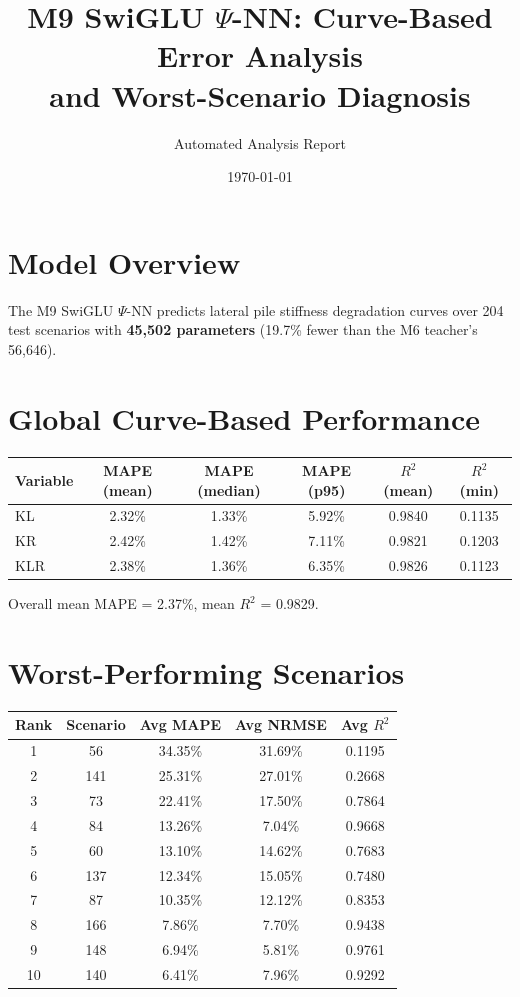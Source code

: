 \documentclass[11pt,a4paper]{article}
\title{M9 SwiGLU $\Psi$-NN: Curve-Based Error Analysis\\and Worst-Scenario Diagnosis}
\author{Automated Analysis Report}
\date{\today}
\begin{document}
\maketitle

\section{Model Overview}
The M9 SwiGLU $\Psi$-NN predicts lateral pile stiffness degradation curves over 204 test scenarios with
\textbf{45,502 parameters} (19.7\% fewer than the M6 teacher's 56,646).

\section{Global Curve-Based Performance}
\begin{table}[h]
\centering
\begin{tabular}{lccccc}
\toprule
\textbf{Variable} & \textbf{MAPE (mean)} & \textbf{MAPE (median)} & \textbf{MAPE (p95)} & \textbf{$R^2$ (mean)} & \textbf{$R^2$ (min)} \\
\midrule
    KL & 2.32\% & 1.33\% & 5.92\% & 0.9840 & 0.1135 \\
    KR & 2.42\% & 1.42\% & 7.11\% & 0.9821 & 0.1203 \\
    KLR & 2.38\% & 1.36\% & 6.35\% & 0.9826 & 0.1123 \\
\bottomrule
\end{tabular}
\end{table}

Overall mean MAPE = 2.37\%, mean $R^2$ = 0.9829.

\section{Worst-Performing Scenarios}
\begin{table}[h]
\centering
\begin{tabular}{ccccc}
\toprule
\textbf{Rank} & \textbf{Scenario} & \textbf{Avg MAPE} & \textbf{Avg NRMSE} & \textbf{Avg $R^2$} \\
\midrule
    1 & 56 & 34.35\% & 31.69\% & 0.1195 \\
    2 & 141 & 25.31\% & 27.01\% & 0.2668 \\
    3 & 73 & 22.41\% & 17.50\% & 0.7864 \\
    4 & 84 & 13.26\% & 7.04\% & 0.9668 \\
    5 & 60 & 13.10\% & 14.62\% & 0.7683 \\
    6 & 137 & 12.34\% & 15.05\% & 0.7480 \\
    7 & 87 & 10.35\% & 12.12\% & 0.8353 \\
    8 & 166 & 7.86\% & 7.70\% & 0.9438 \\
    9 & 148 & 6.94\% & 5.81\% & 0.9761 \\
    10 & 140 & 6.41\% & 7.96\% & 0.9292 \\
\bottomrule
\end{tabular}
\end{table}
\end{document}
